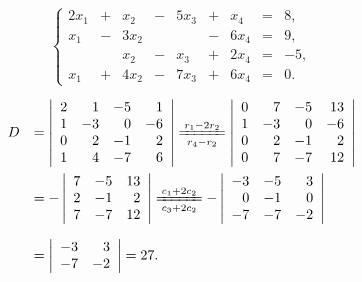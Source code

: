 \begin{frame}
\begin{li}
  $$\left\{
    \begin{array}{rcrcrcrcr}
      2x_1 &+ & x_2 &- & 5x_3&+ & x_4 &= & 8, \\[0.2cm]
      x_1 &- & 3x_2&  &     &- & 6x_4& = & 9, \\[0.2cm]
           &  & x_2 &- & x_3 &+ & 2x_4 &= & -5, \\[0.2cm]
      x_1 &+ & 4x_2&-& 7x_3 &+& 6x_4 &= & 0.
    \end{array}
  \right.
  $$
\end{li} \pause 

\begin{jie}
  $$
  \begin{array}{ll}
    D &= \left|
        \begin{array}{rrrr}
          2 &  1 & -5 &  1\\
          1 & -3 &  0 & -6\\
          0 &  2 & -1 &  2\\
          1 &  4 & -7 &  6
        \end{array}
                        \right|
                        \xlongequal[r_4-r_2]{r_1-2r_2}
                        \left|
                        \begin{array}{rrrr}
                          0 &  7 & -5 & 13\\
                          1 & -3 &  0 & -6\\
                          0 &  2 & -1 &  2\\
                          0 &  7 & -7 & 12
                        \end{array}
                                        \right|\\[0.8cm]
      & = - \left|
        \begin{array}{rrr}
          7  & -5 & 13\\
          2  & -1 &  2\\
          7  & -7 & 12
        \end{array}
                    \right|
                    \xlongequal[c_3+2c_2]{c_1+2c_2}
                    - \left|
                    \begin{array}{rrr}
                      -3  & -5 &  3\\
                      0  & -1 &  0\\
                      -7 & -7 & -2
                    \end{array}
                                \right|\\[0.8cm]
      & =\left| 
        \begin{array}{rr}
          -3 &  3\\
          -7 & -2
        \end{array}
               \right| = 27.
  \end{array}
  $$
\end{jie}
\end{frame}

